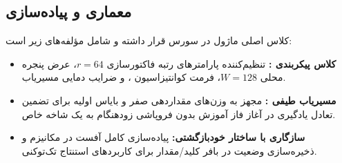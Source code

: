 \subsection{معماری و پیاده‌سازی}
کلاس اصلی ماژول  در سورس  قرار داشته و شامل مؤلفه‌های زیر است:
\begin{itemize}
    \item \textbf{کلاس پیکربندی :} تنظیم‌کننده پارامترهای رتبه فاکتورسازی $r=64$، عرض پنجره محلی $W=128$، فرمت کوانتیزاسیون ، و ضرایب دمایی مسیریاب.
    \item \textbf{مسیریاب طیفی :} مجهز به وزن‌های مقداردهی صفر و بایاس اولیه برای تضمین تعادل یادگیری در آغاز فاز آموزش بدون فروپاشی زودهنگام به یک شاخه خاص.
    \item \textbf{سازگاری با ساختار خودبازگشتی:} پیاده‌سازی کامل آفست  در مکانیزم  و ذخیره‌سازی وضعیت در بافر کلید/مقدار برای کاربردهای استنتاج تک‌توکنی.
\end{itemize}
